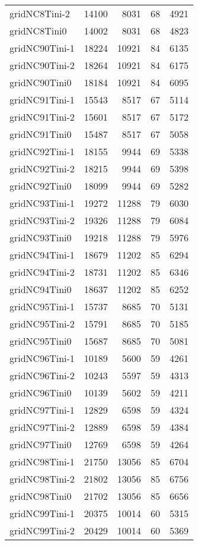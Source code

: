 \begin{longtable}{lrrrr}
gridNC8Tini-2 & 14100 & 8031 & 68 & 4921 \\
gridNC8Tini0 & 14002 & 8031 & 68 & 4823 \\
gridNC90Tini-1 & 18224 & 10921 & 84 & 6135 \\
gridNC90Tini-2 & 18264 & 10921 & 84 & 6175 \\
gridNC90Tini0 & 18184 & 10921 & 84 & 6095 \\
gridNC91Tini-1 & 15543 & 8517 & 67 & 5114 \\
gridNC91Tini-2 & 15601 & 8517 & 67 & 5172 \\
gridNC91Tini0 & 15487 & 8517 & 67 & 5058 \\
gridNC92Tini-1 & 18155 & 9944 & 69 & 5338 \\
gridNC92Tini-2 & 18215 & 9944 & 69 & 5398 \\
gridNC92Tini0 & 18099 & 9944 & 69 & 5282 \\
gridNC93Tini-1 & 19272 & 11288 & 79 & 6030 \\
gridNC93Tini-2 & 19326 & 11288 & 79 & 6084 \\
gridNC93Tini0 & 19218 & 11288 & 79 & 5976 \\
gridNC94Tini-1 & 18679 & 11202 & 85 & 6294 \\
gridNC94Tini-2 & 18731 & 11202 & 85 & 6346 \\
gridNC94Tini0 & 18637 & 11202 & 85 & 6252 \\
gridNC95Tini-1 & 15737 & 8685 & 70 & 5131 \\
gridNC95Tini-2 & 15791 & 8685 & 70 & 5185 \\
gridNC95Tini0 & 15687 & 8685 & 70 & 5081 \\
gridNC96Tini-1 & 10189 & 5600 & 59 & 4261 \\
gridNC96Tini-2 & 10243 & 5597 & 59 & 4313 \\
gridNC96Tini0 & 10139 & 5602 & 59 & 4211 \\
gridNC97Tini-1 & 12829 & 6598 & 59 & 4324 \\
gridNC97Tini-2 & 12889 & 6598 & 59 & 4384 \\
gridNC97Tini0 & 12769 & 6598 & 59 & 4264 \\
gridNC98Tini-1 & 21750 & 13056 & 85 & 6704 \\
gridNC98Tini-2 & 21802 & 13056 & 85 & 6756 \\
gridNC98Tini0 & 21702 & 13056 & 85 & 6656 \\
gridNC99Tini-1 & 20375 & 10014 & 60 & 5315 \\
gridNC99Tini-2 & 20429 & 10014 & 60 & 5369 \\

\end{longtable}
